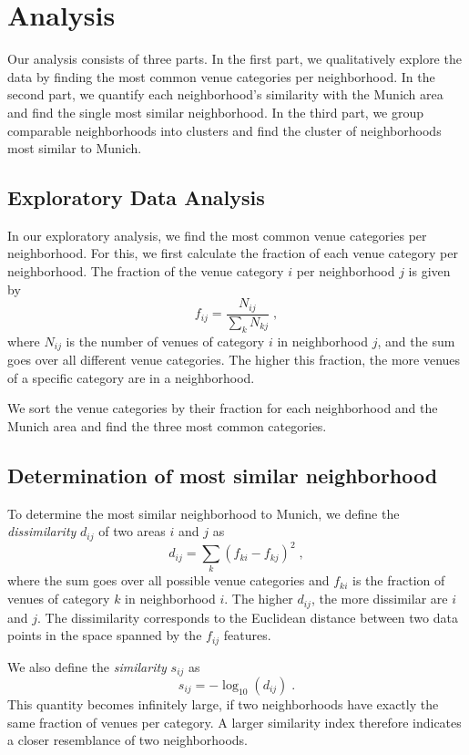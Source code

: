 \documentclass[UKenglish]{scrreprt}
\begin{document}
 
\chapter{Analysis}
\label{sec:Analysis}
Our analysis consists of three parts. In the first part, we qualitatively explore the data by finding the most common venue categories per neighborhood. In the second part, we quantify each neighborhood's similarity with the Munich area and find the single most similar neighborhood. In the third part, we group comparable neighborhoods into clusters and find the cluster of neighborhoods most similar to Munich.
\section{Exploratory Data Analysis}
\label{sec:Analysis: Exploratory}
In our exploratory analysis, we find the most common venue categories per neighborhood. For this, we first calculate the fraction of each venue category per neighborhood. The fraction of the venue category $i$ per neighborhood $j$ is given by
\begin{equation}
	f_{ij}=\frac{N_{ij}}{\sum_k N_{kj}}\;,
\end{equation} 
where $N_{ij}$ is the number of venues of category $i$ in neighborhood $j$, and the sum goes over all different venue categories. The higher this fraction, the more venues of a specific category are in a neighborhood.

We sort the venue categories by their fraction for each neighborhood and the Munich area and find the three most common categories.

\section{Determination of most similar neighborhood}
\label{sec:Analysis:Neighborhood}
To determine the most similar neighborhood to Munich, we define the \emph{dissimilarity} $d_{ij}$ of two areas $i$ and $j$ as
\begin{equation}
	d_{ij}=\sum_{k} (f_{ki}-f_{kj})^2\;,
\end{equation}
where the sum goes over all possible venue categories and $f_{ki}$ is the fraction of venues of category $k$ in neighborhood $i$.
The higher $d_{ij}$, the more dissimilar are $i$ and $j$. The dissimilarity corresponds to the Euclidean distance between two data points in the space spanned by the $f_{ij}$ features.

We also define the \emph{similarity} $s_{ij}$ as 
\begin{equation}
	s_{ij}=-\log_{10}(d_{ij})\;.
\end{equation}
This quantity becomes infinitely large, if two neighborhoods have exactly the same fraction of venues per category. A larger similarity index therefore indicates a closer resemblance of two neighborhoods.
\end{document}
